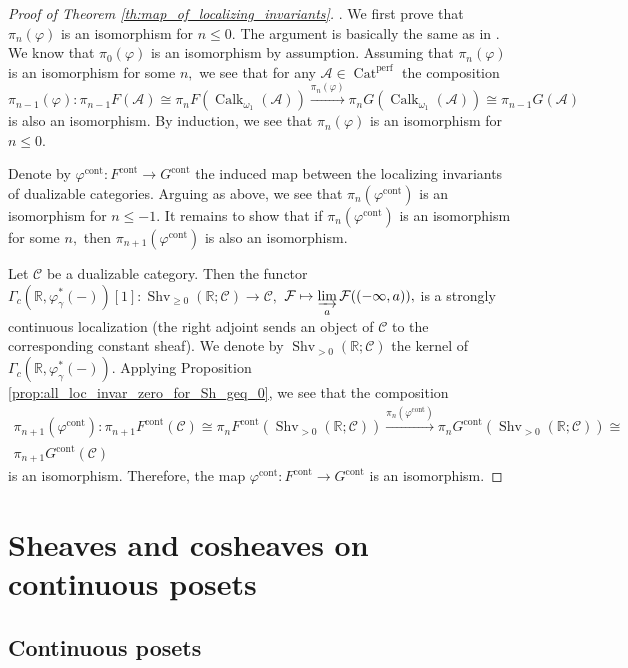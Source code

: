 \documentclass[11pt,leqno]{amsart}
\numberwithin{equation}{section}
\def\R{\mathbb{R}}
\newcommand{\indlim}[1][]{\mathop{\varinjlim}\limits_{#1}}
\newcommand{\xto}{\xrightarrow}
\newcommand{\Cat}{\operatorname{Cat}}
\newcommand{\cont}{\operatorname{cont}}
\newcommand{\cF}{{\mathcal F}}
\newcommand{\cA}{{\mathcal A}}
\newcommand{\cC}{{\mathcal C}}
\newcommand{\perf}{\operatorname{perf}}
\newcommand{\Sh}{\operatorname{Shv}}
\newcommand{\Calk}{\operatorname{Calk}}
\begin{document}
\begin{proof}[Proof of Theorem \ref{th:map_of_localizing_invariants}]. We first prove that $\pi_n(\varphi)$ is an isomorphism for $n\leq 0.$ The argument is basically the same as in \cite{KW19}. We know that $\pi_0(\varphi)$ is an isomorphism by assumption. Assuming that $\pi_n(\varphi)$ is an isomorphism for some $n,$ we see that for any $\cA\in\Cat^{\perf}$ the composition
$$\pi_{n-1}(\varphi):\pi_{n-1}F(\cA)\cong \pi_n F(\Calk_{\omega_1}(\cA))\xto{\pi_n(\varphi)}\pi_n G(\Calk_{\omega_1}(\cA))\cong\pi_{n-1}G(\cA)$$ 
is also an isomorphism. By induction, we see that $\pi_n(\varphi)$ is an isomorphism for $n\leq 0.$

Denote by $\varphi^{\cont}:F^{\cont}\to G^{\cont}$ the induced map between the localizing invariants of dualizable categories. Arguing as above, we see that $\pi_n(\varphi^{\cont})$ is an isomorphism for $n\leq -1.$ It remains to show that if $\pi_n(\varphi^{\cont})$ is an isomorphism for some $n,$ then $\pi_{n+1}(\varphi^{\cont})$ is also an isomorphism.

Let $\cC$ be a dualizable category. Then the functor $\Gamma_c(\R,\varphi_{\gamma}^*(-))[1]:\Sh_{\geq 0}(\R;\cC)\to\cC,$ $\cF\mapsto \indlim[a]\cF((-\infty,a)),$ is a strongly continuous localization (the right adjoint sends an object of $\cC$ to the corresponding constant sheaf). We denote by $\Sh_{>0}(\R;\cC)$ the kernel of $\Gamma_c(\R,\varphi_{\gamma}^*(-)).$ Applying Proposition \ref{prop:all_loc_invar_zero_for_Sh_geq_0}, we see that the composition
\begin{multline*}\pi_{n+1}(\varphi^{\cont}):\pi_{n+1}F^{\cont}(\cC)\cong \pi_n F^{\cont}(\Sh_{>0}(\R;\cC))\xto{\pi_n(\varphi^{\cont})} \pi_n G^{\cont}(\Sh_{>0}(\R;\cC))\cong \\
\pi_{n+1}G^{\cont}(\cC)\end{multline*} is an isomorphism. Therefore, the map $\varphi^{\cont}:F^{\cont}\to G^{\cont}$ is an isomorphism. 
\end{proof}

\section{Sheaves and cosheaves on continuous posets}
\label{sec:sh_cosh_continuous_posets}

\subsection{Continuous posets}
\label{ssec:cont_posets}
\end{document}
